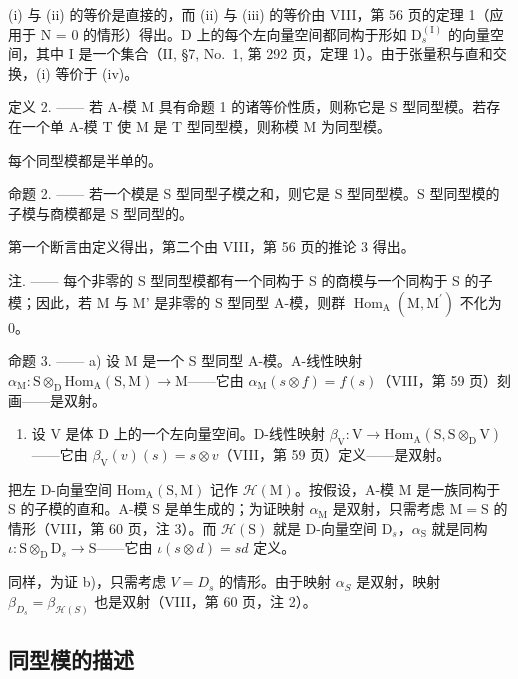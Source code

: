 (i) 与 (ii) 的等价是直接的，而 (ii) 与 (iii) 的等价由 VIII，第 56 页的定理 1（应用于 N = 0 的情形）得出。D 上的每个左向量空间都同构于形如 \(\mathrm{D}_{s}^{(\mathrm{I})}\) 的向量空间，其中 I 是一个集合（II, §7, No.~1, 第 292 页，定理 1）。由于张量积与直和交换，(i) 等价于 (iv)。

定义 2. —— 若 A-模 M 具有命题 1 的诸等价性质，则称它是 S 型同型模。若存在一个单 A-模 T 使 M 是 T 型同型模，则称模 M 为同型模。

每个同型模都是半单的。

命题 2. —— 若一个模是 S 型同型子模之和，则它是 S 型同型模。S 型同型模的子模与商模都是 S 型同型的。

第一个断言由定义得出，第二个由 VIII，第 56 页的推论 3 得出。

注. —— 每个非零的 S 型同型模都有一个同构于 S 的商模与一个同构于 S 的子模；因此，若 M 与 M' 是非零的 S 型同型 A-模，则群 \(\operatorname{Hom}_{\mathrm{A}}(\mathrm{M},\mathrm{M}^{\prime})\) 不化为 0。

命题 3. —— a) 设 M 是一个 S 型同型 A-模。A-线性映射 \(\alpha_{\mathrm{M}}: \mathrm{S} \otimes_{\mathrm{D}} \mathrm{Hom}_{\mathrm{A}}(\mathrm{S}, \mathrm{M}) \to \mathrm{M}\)——它由 \(\alpha_{\mathrm{M}}(s \otimes f) = f(s)\)（VIII，第 59 页）刻画——是双射。

\begin{enumerate}
\def\labelenumi{\alph{enumi})}
\setcounter{enumi}{1}
\tightlist
\item
  设 V 是体 D 上的一个左向量空间。D-线性映射 \(\beta_{\mathrm{V}}: \mathrm{V} \to \mathrm{Hom}_{\mathrm{A}}(\mathrm{S}, \mathrm{S} \otimes_{\mathrm{D}} \mathrm{V})\)——它由 \(\beta_{\mathrm{V}}(v)(s) = s \otimes v\)（VIII，第 59 页）定义——是双射。
\end{enumerate}

把左 D-向量空间 \(\mathrm{Hom}_{\mathrm{A}}(\mathrm{S},\mathrm{M})\) 记作 \(\mathcal{H}(\mathrm{M})\)。按假设，A-模 M 是一族同构于 S 的子模的直和。A-模 S 是单生成的；为证映射 \(\alpha_{\mathrm{M}}\) 是双射，只需考虑 \(\mathrm{M} = \mathrm{S}\) 的情形（VIII，第 60 页，注 3）。而 \(\mathcal{H}(\mathrm{S})\) 就是 D-向量空间 \(\mathrm{D}_s\)，\(\alpha_{\mathrm{S}}\) 就是同构 \(\iota : \mathrm{S} \otimes_{\mathrm{D}} \mathrm{D}_s \to \mathrm{S}\)——它由 \(\iota(s \otimes d) = sd\) 定义。

同样，为证 b)，只需考虑 \(V = D_{s}\) 的情形。由于映射 \(\alpha_{S}\) 是双射，映射 \(\beta_{D_{s}} = \beta_{\mathcal{H}(S)}\) 也是双射（VIII，第 60 页，注 2）。

\subsection{同型模的描述}

